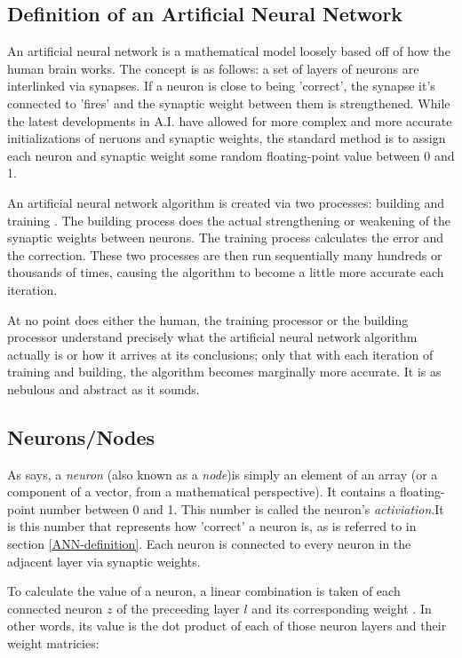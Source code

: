 \documentclass[12pt]{article}
\begin{document}
    \subsection{Definition of an Artificial Neural Network \label{ANN-definition}}
        
        An artificial neural network is a mathematical model loosely based off of how the human brain works. The concept is as follows: a set of layers of neurons are interlinked via synapses. If a neuron is close to being 'correct', the synapse it's connected to 'fires' and the synaptic weight between them is strengthened. While the latest developments in A.I. have allowed for more complex and  more accurate initializations of neruons and synaptic weights, the standard method is to assign each neuron and synaptic weight some random floating-point value between 0 and 1. 

        An artificial neural network algorithm is created via two processes: building and training \textcite{GCPGreyAI}. The building process does the actual strengthening or weakening of the synaptic weights between neurons. The training  process calculates the error and the correction. These two processes are then run sequentially many hundreds or thousands of times, causing the algorithm to become a little more accurate each iteration.
        
        At no point does either the human, the training processor or the building processor understand precisely what the artificial neural network algorithm actually is or how it arrives at its conclusions; only that with each iteration of training and building, the algorithm becomes marginally more accurate. It is as nebulous and abstract as it sounds.

    \subsection{Neurons/Nodes \label{neuron}}
        
        As \textcite{DeepLearningCh1} says, a \textit{neuron} (also known as a \textit{node})is simply an element of an array (or a component of a vector, from a mathematical perspective). It contains a floating-point number between 0 and 1. This number is called the neuron's \textit{activiation}.It is this number that represents how 'correct' a neuron is, as is referred to in section \ref{ANN-definition}. Each neuron is connected to every neuron in the adjacent layer via synaptic weights.

        To calculate the value of a neuron, a linear combination is taken of each connected neuron $z$ of the preceeding layer $l$ and its corresponding weight \textcite{sharma2017}. In other words, its value is the dot product of each of those neuron layers and their weight matricies:
\end{document}
